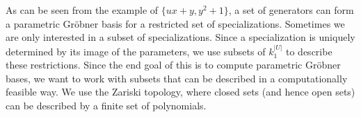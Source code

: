 





As can be seen from the example of $\{ux + y, y^2 + 1\}$, a set of generators can form a parametric Gröbner basis for a restricted set of specializations. Sometimes we are only interested in a subset of specializations. Since a specialization is uniquely determined by its image of the parameters, we use subsets of $k_{1}^{|U|}$ to describe these restrictions. Since the end goal of this is to compute parametric Gröbner bases, we want to work with subsets that can be described in a computationally feasible way. We use the Zariski topology, where closed sets (and hence open sets) can be described by a finite set of polynomials.

